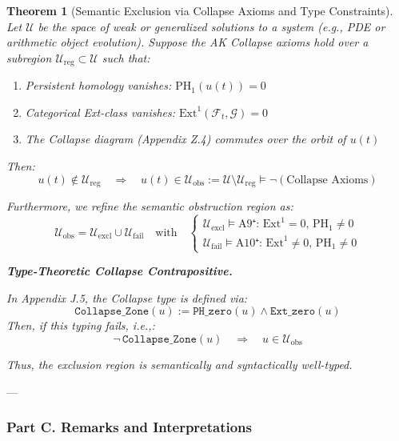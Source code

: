 \documentclass[11pt]{article}
\newtheorem{theorem}{Theorem}[section]
\begin{document}
\begin{axiom}
\begin{axiom}
{{\begin{theorem}[Semantic Exclusion via Collapse Axioms and Type Constraints]
Let \( \mathcal{U} \) be the space of weak or generalized solutions to a system (e.g., PDE or arithmetic object evolution).  
Suppose the AK Collapse axioms hold over a subregion \( \mathcal{U}_{\mathrm{reg}} \subset \mathcal{U} \) such that:

\begin{enumerate}
  \item Persistent homology vanishes: \( \mathrm{PH}_1(u(t)) = 0 \)
  \item Categorical Ext-class vanishes: \( \mathrm{Ext}^1(\mathcal{F}_t, \mathcal{G}) = 0 \)
  \item The Collapse diagram (Appendix Z.4) commutes over the orbit of \( u(t) \)
\end{enumerate}

Then:
\[
u(t) \notin \mathcal{U}_{\mathrm{reg}} \quad \Rightarrow \quad u(t) \in \mathcal{U}_{\mathrm{obs}} := \mathcal{U} \setminus \mathcal{U}_{\mathrm{reg}} \models \neg(\text{Collapse Axioms})
\]

Furthermore, we refine the semantic obstruction region as:
\[
\mathcal{U}_{\mathrm{obs}} = \mathcal{U}_{\mathrm{excl}} \cup \mathcal{U}_{\mathrm{fail}}
\quad \text{with} \quad
\begin{cases}
\mathcal{U}_{\mathrm{excl}} \models \text{A9⁺: } \mathrm{Ext}^1 = 0,\, \mathrm{PH}_1 \neq 0 \\
\mathcal{U}_{\mathrm{fail}} \models \text{A10⁺: } \mathrm{Ext}^1 \neq 0,\, \mathrm{PH}_1 \neq 0
\end{cases}
\]

\textbf{Type-Theoretic Collapse Contrapositive.}

In Appendix J.5, the Collapse type is defined via:
\[
\texttt{Collapse\_Zone}(u) := \texttt{PH\_zero}(u) \land \texttt{Ext\_zero}(u)
\]
Then, if this typing fails, i.e.,:
\[
\neg\, \texttt{Collapse\_Zone}(u) \quad \Rightarrow \quad u \in \mathcal{U}_{\mathrm{obs}}
\]

Thus, the exclusion region is semantically and syntactically well-typed.

\end{theorem}

---

\subsubsection*{Part C. Remarks and Interpretations}

}}
\end{axiom}
\end{axiom}
\end{document}
